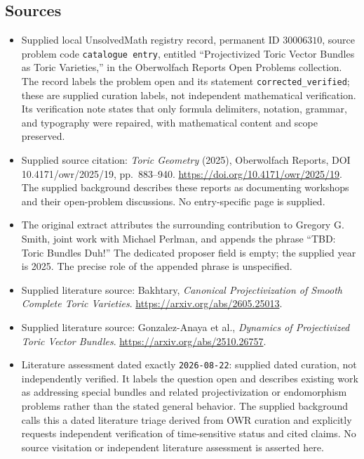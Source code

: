 \documentclass[11pt]{article}
\begin{document}
\subsection{Sources}
\begin{itemize}
\item Supplied local UnsolvedMath registry record, permanent ID \(30006310\), source problem code \texttt{catalogue entry}, entitled ``Projectivized Toric Vector Bundles as Toric Varieties,'' in the Oberwolfach Reports Open Problems collection. The record labels the problem open and its statement \texttt{corrected\_verified}; these are supplied curation labels, not independent mathematical verification. Its verification note states that only formula delimiters, notation, grammar, and typography were repaired, with mathematical content and scope preserved.
\item Supplied source citation: \emph{Toric Geometry} (2025), Oberwolfach Reports, DOI 10.4171/owr/2025/19, pp.\ 883--940. \url{https://doi.org/10.4171/owr/2025/19}. The supplied background describes these reports as documenting workshops and their open-problem discussions. No entry-specific page is supplied.
\item The original extract attributes the surrounding contribution to Gregory G. Smith, joint work with Michael Perlman, and appends the phrase ``TBD: Toric Bundles Duh!'' The dedicated proposer field is empty; the supplied year is 2025. The precise role of the appended phrase is unspecified.
\item Supplied literature source: Bakhtary, \emph{Canonical Projectivization of Smooth Complete Toric Varieties}. \url{https://arxiv.org/abs/2605.25013}.
\item Supplied literature source: Gonzalez-Anaya et al., \emph{Dynamics of Projectivized Toric Vector Bundles}. \url{https://arxiv.org/abs/2510.26757}.
\item Literature assessment dated exactly \texttt{2026-08-22}: supplied dated curation, not independently verified. It labels the question open and describes existing work as addressing special bundles and related projectivization or endomorphism problems rather than the stated general behavior. The supplied background calls this a dated literature triage derived from OWR curation and explicitly requests independent verification of time-sensitive status and cited claims. No source visitation or independent literature assessment is asserted here.
\end{itemize}
\end{document}

